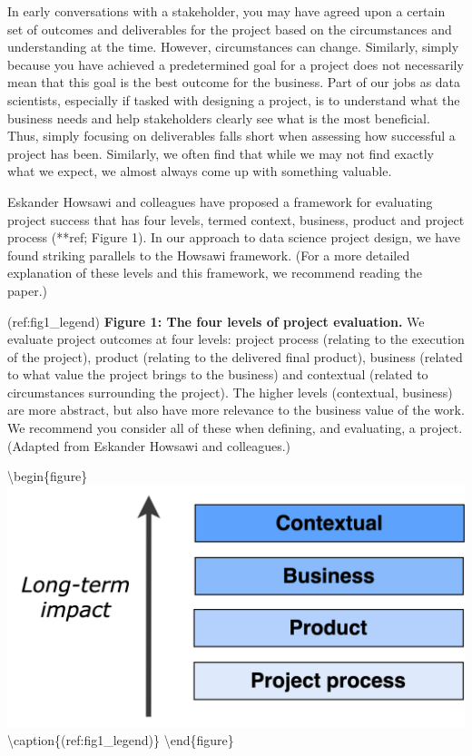 \documentclass[
]{book}
\begin{document}
In early conversations with a stakeholder, you may have agreed upon a certain set of outcomes and deliverables for the project based on the circumstances and understanding at the time. However, circumstances can change. Similarly, simply because you have achieved a predetermined goal for a project does not necessarily mean that this goal is the best outcome for the business. Part of our jobs as data scientists, especially if tasked with designing a project, is to understand what the business needs and help stakeholders clearly see what is the most beneficial. Thus, simply focusing on deliverables falls short when assessing how successful a project has been. Similarly, we often find that while we may not find exactly what we expect, we almost always come up with something valuable.

Eskander Howsawi and colleagues have proposed a framework for evaluating project success that has four levels, termed context, business, product and project process (**ref; Figure 1). In our approach to data science project design, we have found striking parallels to the Howsawi framework. (For a more detailed explanation of these levels and this framework, we recommend reading the paper.)

(ref:fig1\_legend) \textbf{Figure 1: The four levels of project evaluation.} We evaluate project outcomes at four levels: project process (relating to the execution of the project), product (relating to the delivered final product), business (related to what value the project brings to the business) and contextual (related to circumstances surrounding the project). The higher levels (contextual, business) are more abstract, but also have more relevance to the business value of the work. We recommend you consider all of these when defining, and evaluating, a project. (Adapted from Eskander Howsawi and colleagues.)

\textbackslash begin\{figure\}
\includegraphics[width=0.7\linewidth]{figures/Figure_1-eval_levels} \textbackslash caption\{(ref:fig1\_legend)\}\label{fig:eval-levels}
\textbackslash end\{figure\}
\end{document}
